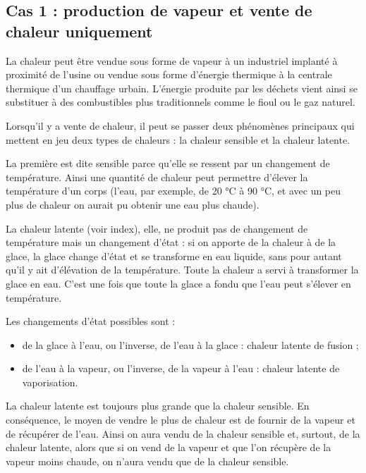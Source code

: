 \subsection{Cas 1 : production de vapeur et vente de chaleur uniquement}

La chaleur peut être vendue sous forme de vapeur à un industriel implanté à proximité de l’usine ou vendue sous forme d’énergie thermique à la centrale thermique d’un chauffage urbain. L’énergie produite par les déchets vient ainsi se substituer à des combustibles plus traditionnels comme le fioul ou le gaz naturel.
\vspace{0.3cm}



Lorsqu’il y a vente de chaleur, il peut se passer deux phénomènes principaux qui mettent en jeu deux types de chaleurs : la chaleur sensible et la chaleur latente. 

\vspace{0.3cm}

La première est dite sensible parce qu’elle se ressent par un changement de température. Ainsi une quantité de chaleur peut permettre d’élever la température d’un corps (l’eau, par exemple, de 20 °C à 90 °C, et avec un peu plus de chaleur on aurait pu obtenir une eau plus chaude).

\vspace{0.3cm}

La chaleur latente (voir index), elle, ne produit pas de changement de température mais un changement d’état : si on apporte de la chaleur à de la glace, la glace change d’état et se transforme en eau liquide, sans pour autant qu’il y ait d’élévation de la température. Toute la chaleur a servi à transformer la glace en eau. C’est une fois que toute la glace a fondu que l’eau peut s’élever en température.

\vspace{0.3cm}

Les changements d’état possibles sont :

\begin{itemize}
\item de la glace à l’eau, ou l’inverse, de l’eau à la glace : chaleur latente de fusion ;
\item de l’eau à la vapeur, ou l’inverse, de la vapeur à l’eau : chaleur latente de vaporisation.

\end{itemize}

La chaleur latente est toujours plus grande que la chaleur sensible.
En conséquence, le moyen de vendre le plus de chaleur est de fournir de la vapeur et de récupérer de l’eau. Ainsi on aura vendu de la chaleur sensible et, surtout, de la chaleur latente, alors que si on vend de la vapeur et que l’on récupère de la vapeur moins chaude, on n’aura vendu que de la chaleur sensible.
\vspace{0.3cm}

